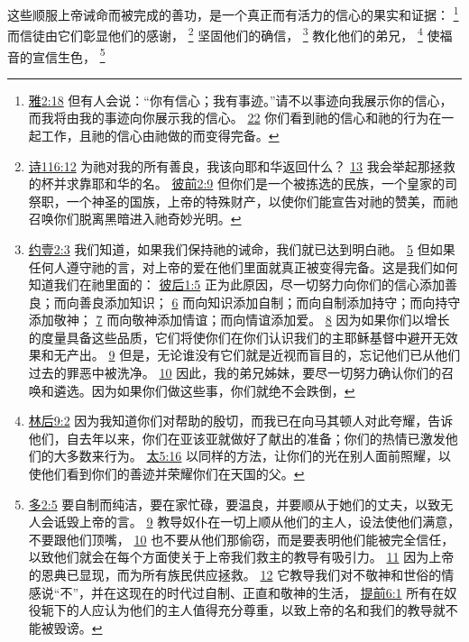 \documentclass[12pt, a4paper, oneside]{ctexart}
\newcounter{parnum}[section]
\newcommand{\N}{%
   \noindent\refstepcounter{parnum}%
    \makebox[\parindent][l]{\textbf{\arabic{parnum}.}}}
\begin{document}
\N 这些顺服上帝诫命而被完成的善功，是一个真正而有活力的信心的果实和证据：
	\footnote {
		\href{https://biblehub.com/james/2-18.htm}{雅2:18} 但有人会说：“你有信心；我有事迹。”请不以事迹向我展示你的信心，而我将由我的事迹向你展示我的信心。
		\href{https://biblehub.com/james/2-22.htm}{22} 你们看到祂的信心和祂的行为在一起工作，且祂的信心由祂做的而变得完备。
	}
	而信徒由它们彰显他们的感谢，
	\footnote {
		\href{https://biblehub.com/psalms/116-12.htm}{诗116:12} 为祂对我的所有善良，我该向耶和华返回什么？
		\href{https://biblehub.com/psalms/116-13.htm}{13} 我会举起那拯救的杯并求靠耶和华的名。
		\href{https://biblehub.com/1_peter/2-9.htm}{彼前2:9} 但你们是一个被拣选的民族，一个皇家的司祭职，一个神圣的国族，上帝的特殊财产，以使你们能宣告对祂的赞美，而祂召唤你们脱离黑暗进入祂奇妙光明。
	}
	坚固他们的确信，
	\footnote {
		\href{https://biblehub.com/1_john/2-3.htm}{约壹2:3} 我们知道，如果我们保持祂的诫命，我们就已达到明白祂。
		\href{https://biblehub.com/1_john/2-5.htm}{5} 但如果任何人遵守祂的言，对上帝的爱在他们里面就真正被变得完备。这是我们如何知道我们在祂里面的：
		\href{https://biblehub.com/2_peter/1-5.htm}{彼后1:5} 正为此原因，尽一切努力向你们的信心添加善良；而向善良添加知识；
		\href{https://biblehub.com/2_peter/1-6.htm}{6} 而向知识添加自制；而向自制添加持守；而向持守添加敬神；
		\href{https://biblehub.com/2_peter/1-7.htm}{7} 而向敬神添加情谊；而向情谊添加爱。
		\href{https://biblehub.com/2_peter/1-8.htm}{8} 因为如果你们以增长的度量具备这些品质，它们将使你们在你们认识我们的主耶稣基督中避开无效果和无产出。
		\href{https://biblehub.com/2_peter/1-9.htm}{9} 但是，无论谁没有它们就是近视而盲目的，忘记他们已从他们过去的罪恶中被洗净。
		\href{https://biblehub.com/2_peter/1-10.htm}{10} 因此，我的弟兄姊妹，要尽一切努力确认你们的召唤和遴选。因为如果你们做这些事，你们就绝不会跌倒，
	}
	教化他们的弟兄，
	\footnote {
		\href{https://biblehub.com/2_corinthians/9-2.htm}{林后9:2} 因为我知道你们对帮助的殷切，而我已在向马其顿人对此夸耀，告诉他们，自去年以来，你们在亚该亚就做好了献出的准备；你们的热情已激发他们的大多数来行为。
		\href{https://biblehub.com/matthew/5-16.htm}{太5:16} 以同样的方法，让你们的光在别人面前照耀，以使他们看到你们的善迹并荣耀你们在天国的父。
	}
	使福音的宣信生色，
	\footnote {
		\href{https://biblehub.com/titus/2-5.htm}{多2:5} 要自制而纯洁，要在家忙碌，要温良，并要顺从于她们的丈夫，以致无人会诋毁上帝的言。
		\href{https://biblehub.com/titus/2-9.htm}{9} 教导奴仆在一切上顺从他们的主人，设法使他们满意，不要跟他们顶嘴，
		\href{https://biblehub.com/titus/2-10.htm}{10} 也不要从他们那偷窃，而是要表明他们能被完全信任，以致他们就会在每个方面使关于上帝我们救主的教导有吸引力。
		\href{https://biblehub.com/titus/2-11.htm}{11} 因为上帝的恩典已显现，而为所有族民供应拯救。
		\href{https://biblehub.com/titus/2-12.htm}{12} 它教导我们对不敬神和世俗的情感说“不”，并在这现在的时代过自制、正直和敬神的生活，
		\href{https://biblehub.com/1_timothy/6-1.htm}{提前6:1} 所有在奴役轭下的人应认为他们的主人值得充分尊重，以致上帝的名和我们的教导就不能被毁谤。
	}
\end{document}
